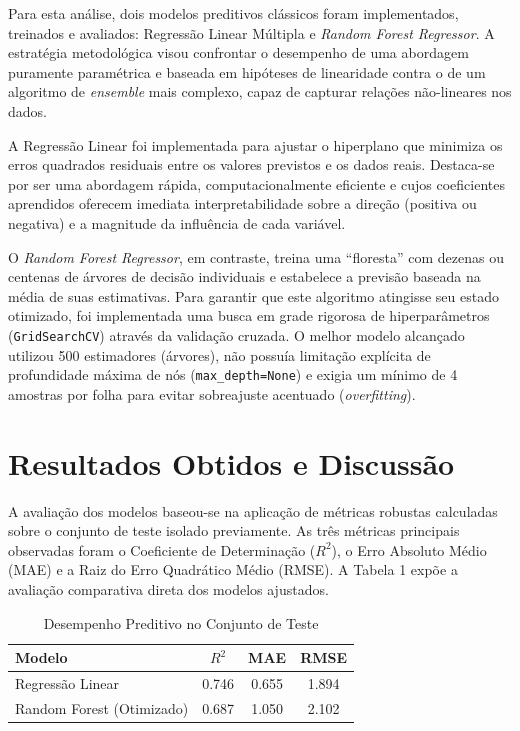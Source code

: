 \documentclass[12pt]{article}
\begin{document}
Para esta análise, dois modelos preditivos clássicos foram implementados, treinados e avaliados: Regressão Linear Múltipla e \textit{Random Forest Regressor}. A estratégia metodológica visou confrontar o desempenho de uma abordagem puramente paramétrica e baseada em hipóteses de linearidade contra o de um algoritmo de \textit{ensemble} mais complexo, capaz de capturar relações não-lineares nos dados.

A Regressão Linear foi implementada para ajustar o hiperplano que minimiza os erros quadrados residuais entre os valores previstos e os dados reais. Destaca-se por ser uma abordagem rápida, computacionalmente eficiente e cujos coeficientes aprendidos oferecem imediata interpretabilidade sobre a direção (positiva ou negativa) e a magnitude da influência de cada variável.

O \textit{Random Forest Regressor}, em contraste, treina uma ``floresta'' com dezenas ou centenas de árvores de decisão individuais e estabelece a previsão baseada na média de suas estimativas. Para garantir que este algoritmo atingisse seu estado otimizado, foi implementada uma busca em grade rigorosa de hiperparâmetros (\texttt{GridSearchCV}) através da validação cruzada. O melhor modelo alcançado utilizou 500 estimadores (árvores), não possuía limitação explícita de profundidade máxima de nós (\texttt{max\_depth=None}) e exigia um mínimo de 4 amostras por folha para evitar sobreajuste acentuado (\textit{overfitting}).

\section{Resultados Obtidos e Discussão}

A avaliação dos modelos baseou-se na aplicação de métricas robustas calculadas sobre o conjunto de teste isolado previamente. As três métricas principais observadas foram o Coeficiente de Determinação ($R^{2}$), o Erro Absoluto Médio (MAE) e a Raiz do Erro Quadrático Médio (RMSE). A Tabela 1 expõe a avaliação comparativa direta dos modelos ajustados.

\begin{table}[ht]
\centering
\caption{Desempenho Preditivo no Conjunto de Teste}
\label{tab:desempenho}
\begin{tabular}{lccc}
\toprule
\textbf{Modelo} & \textbf{$R^2$} & \textbf{MAE} & \textbf{RMSE} \\
\midrule
Regressão Linear & 0.746 & 0.655 & 1.894 \\
Random Forest (Otimizado) & 0.687 & 1.050 & 2.102 \\
\bottomrule
\end{tabular}
\end{table}
\end{document}
